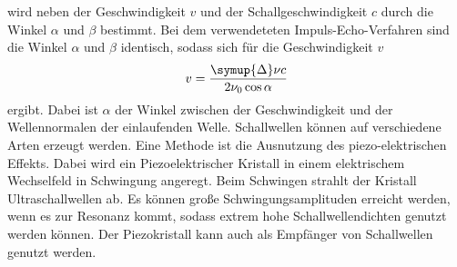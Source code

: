 wird neben der Geschwindigkeit $v$ und der Schallgeschwindigkeit $c$ durch die Winkel $\alpha$ und $\beta$ bestimmt. Bei dem verwendeteten Impuls-Echo-Verfahren sind die Winkel $\alpha$ und $\beta$ identisch,
sodass sich für die Geschwindigkeit $v$
\begin{equation}
    v= \frac{\symup{\Delta}\nu c}{2 \nu_0 \cos \alpha}
    \label{eqn:geschw}
\end{equation}
ergibt. Dabei ist $\alpha$ der Winkel zwischen der Geschwindigkeit und der Wellennormalen der einlaufenden Welle. Schallwellen können auf verschiedene Arten erzeugt werden.
Eine Methode ist die Ausnutzung des piezo-elektrischen Effekts. Dabei wird ein Piezoelektrischer Kristall in einem elektrischem Wechselfeld in Schwingung angeregt.
Beim Schwingen strahlt der Kristall Ultraschallwellen ab. Es können große Schwingungsamplituden erreicht werden, wenn es zur Resonanz kommt, sodass extrem hohe Schallwellendichten genutzt werden können.
Der Piezokristall kann auch als Empfänger von Schallwellen genutzt werden.

